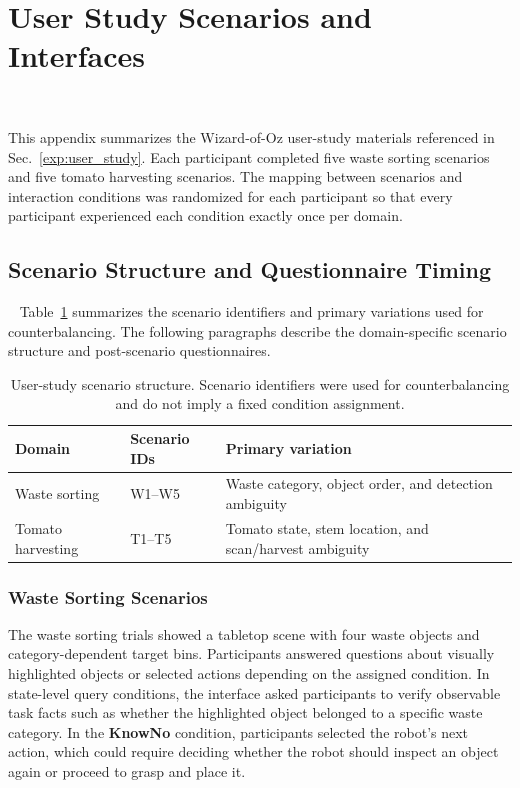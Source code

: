\section{User Study Scenarios and Interfaces}~\label{appx:user}

This appendix summarizes the Wizard-of-Oz user-study materials referenced in Sec.~\ref{exp:user_study}. Each participant completed five waste sorting scenarios and five tomato harvesting scenarios. The mapping between scenarios and interaction conditions was randomized for each participant so that every participant experienced each condition exactly once per domain.

\subsection{Scenario Structure and Questionnaire Timing}~\label{appx:user_scenarios}
Table~\ref{tab:app_user_scenarios} summarizes the scenario identifiers and primary variations used for counterbalancing. The following paragraphs describe the domain-specific scenario structure and post-scenario questionnaires.

\begin{table}[h]
\centering
\caption{User-study scenario structure. Scenario identifiers were used for counterbalancing and do not imply a fixed condition assignment.}
\label{tab:app_user_scenarios}
\small
\begin{tabular}{lll}
\toprule
\textbf{Domain} & \textbf{Scenario IDs} & \textbf{Primary variation} \\
\midrule
Waste sorting & W1--W5 & Waste category, object order, and detection ambiguity \\
Tomato harvesting & T1--T5 & Tomato state, stem location, and scan/harvest ambiguity \\
\bottomrule
\end{tabular}
\end{table}

\subsubsection{Waste Sorting Scenarios}
The waste sorting trials showed a tabletop scene with four waste objects and category-dependent target bins. Participants answered questions about visually highlighted objects or selected actions depending on the assigned condition. In state-level query conditions, the interface asked participants to verify observable task facts such as whether the highlighted object belonged to a specific waste category. In the \textbf{KnowNo} condition, participants selected the robot's next action, which could require deciding whether the robot should inspect an object again or proceed to grasp and place it.

